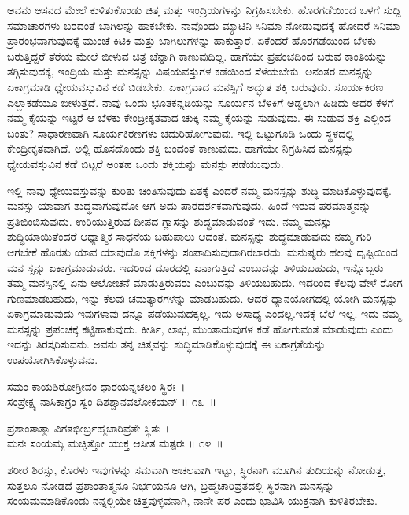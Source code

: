 ಅವನು ಆಸನದ ಮೇಲೆ ಕುಳಿತುಕೊಂಡು ಚಿತ್ತ ಮತ್ತು ಇಂದ್ರಿಯಗಳನ್ನು ನಿಗ್ರಹಿಸಬೇಕು. ಹೊರಗಡೆಯಿಂದ ಒಳಗೆ ಸುದ್ದಿ ಸಮಾಚಾರಗಳು ಬರದಂತೆ ಬಾಗಿಲನ್ನು ಹಾಕಬೇಕು. ನಾವೊಂದು ಮ್ಯಾಟಿನಿ ಸಿನಿಮಾ ನೋಡುವುದಕ್ಕೆ ಹೋದರೆ ಸಿನಿಮಾ ಪ್ರಾರಂಭವಾಗುವುದಕ್ಕೆ ಮುಂಚೆ ಕಿಟಿಕಿ ಮತ್ತು ಬಾಗಿಲುಗಳನ್ನು ಹಾಕುತ್ತಾರೆ. ಏಕೆಂದರೆ ಹೊರಗಡೆಯಿಂದ ಬೆಳಕು ಬರುತ್ತಿದ್ದರೆ ತೆರೆಯ ಮೇಲೆ ಬೀಳುವ ಚಿತ್ರ ಚೆನ್ನಾಗಿ ಕಾಣುವುದಿಲ್ಲ. ಹಾಗೆಯೇ ಪ್ರಪಂಚದಿಂದ ಬರುವ ಕಾಂತಿಯನ್ನು ತಗ್ಗಿಸುವುದಕ್ಕೆ, ಇಂದ್ರಿಯ ಮತ್ತು ಮನಸ್ಸನ್ನು ವಿಷಯವಸ್ತುಗಳ ಕಡೆಯಿಂದ ಸೆಳೆಯಬೇಕು. ಅನಂತರ ಮನಸ್ಸನ್ನು ಏಕಾಗ್ರಮಾಡಿ ಧ್ಯೇಯವಸ್ತುವಿನ ಕಡೆ ಬಿಡಬೇಕು. ಏಕಾಗ್ರವಾದ ಮನಸ್ಸಿಗೆ ಅದ್ಭುತ ಶಕ್ತಿ ಬರುವುದು. ಸೂರ್ಯಕಿರಣ ಎಲ್ಲಾಕಡೆಯೂ ಬೀಳುತ್ತದೆ. ನಾವು ಒಂದು ಭೂತಕನ್ನಡಿಯನ್ನು ಸೂರ್ಯನ ಬೆಳಕಿಗೆ ಅಡ್ಡಲಾಗಿ ಹಿಡಿದು ಅದರ ಕೆಳಗೆ ನಮ್ಮ ಕೈಯನ್ನು ಇಟ್ಟರೆ ಆ ಬೆಳಕು ಕೇಂದ್ರೀಕೃತವಾದ ಚುಕ್ಕಿ ನಮ್ಮ ಕೈಯನ್ನು ಸುಡುವುದು. ಈ ಸುಡುವ ಶಕ್ತಿ ಎಲ್ಲಿಂದ ಬಂತು? ಸಾಧಾರಣವಾಗಿ ಸೂರ್ಯಕಿರಣಗಳು ಚದುರಿಹೋಗುವುವು. ಇಲ್ಲಿ ಒಟ್ಟುಗೂಡಿ ಒಂದು ಸ್ಥಳದಲ್ಲಿ ಕೇಂದ್ರೀಕೃತವಾಗಿದೆ. ಅಲ್ಲಿ ಹೊಸದೊಂದು ಶಕ್ತಿ ಬಂದಂತೆ ಕಾಣುವುದು. ಹಾಗೆಯೇ ನಿಗ್ರಹಿಸಿದ ಮನಸ್ಸನ್ನು ಧ್ಯೇಯವಸ್ತುವಿನ ಕಡೆ ಬಿಟ್ಟರೆ ಅಂತಹ ಒಂದು ಶಕ್ತಿಯನ್ನು ಮನಸ್ಸು ಪಡೆಯುವುದು.

ಇಲ್ಲಿ ನಾವು ಧ್ಯೇಯವಸ್ತುವನ್ನು ಕುರಿತು ಚಿಂತಿಸುವುದು ಏತಕ್ಕೆ ಎಂದರೆ ನಮ್ಮ ಮನಸ್ಸನ್ನು ಶುದ್ಧಿ ಮಾಡಿಕೊಳ್ಳುವುದಕ್ಕೆ. ಮನಸ್ಸು ಯಾವಾಗ ಶುದ್ಧವಾಗುವುದೋ ಆಗ ಅದು ಪಾರದರ್ಶಕವಾಗುವುದು, ಹಿಂದೆ ಇರುವ ಪರಮಾತ್ಮನನ್ನು ಪ್ರತಿಬಿಂಬಿಸುವುದು. ಉರಿಯುತ್ತಿರುವ ದೀಪದ ಗ್ಲಾಸನ್ನು ಶುದ್ಧಮಾಡುವಂತೆ ಇದು. ನಮ್ಮ ಮನಸ್ಸು ಶುದ್ಧಿಯಾಯಿತೆಂದರೆ ಆಧ್ಯಾತ್ಮಿಕ ಸಾಧನೆಯ ಬಹುಪಾಲು ಆದಂತೆ. ಮನಸ್ಸನ್ನು ಶುದ್ಧಮಾಡುವುದು ನಮ್ಮ ಗುರಿ ಆಗಬೇಕೆ ಹೊರತು ಯಾವ ಯಾವುದೊ ಶಕ್ತಿಗಳನ್ನು ಸಂಪಾದಿಸುವುದಾಗಿರಬಾರದು. ಮನುಷ್ಯರು ಹಲವು ದೃಷ್ಟಿಯಿಂದ ಮನ ಸ್ಸನ್ನು ಏಕಾಗ್ರಮಾಡುವರು. ಇದರಿಂದ ದೂರದಲ್ಲಿ ಏನಾಗುತ್ತಿದೆ ಎಂಬುದನ್ನು ತಿಳಿಯಬಹುದು, ಇನ್ನೊಬ್ಬರು ತಮ್ಮ ಮನಸ್ಸಿನಲ್ಲಿ ಏನು ಆಲೋಚನೆ ಮಾಡುತ್ತಿರುವರು ಎಂಬುದನ್ನು ತಿಳಿಯಬಹುದು. ಇದರಿಂದ ಕೆಲವು ವೇಳೆ ರೋಗ ಗುಣಮಾಡಬಹುದು, ಇನ್ನು ಕೆಲವು ಚಮತ್ಕಾರಗಳನ್ನು ಮಾಡಬಹುದು. ಆದರೆ ಧ್ಯಾನಯೋಗದಲ್ಲಿ ಯೋಗಿ ಮನಸ್ಸನ್ನು ಏಕಾಗ್ರಮಾಡುವುದು ಇವುಗಳಾವು ದನ್ನೂ ಪಡೆಯುವುದಕ್ಕಲ್ಲ. ಇದು ಅಸಾಧ್ಯ ಎಂದಲ್ಲ.ಇದಕ್ಕೆ ಬೆಲೆ ಇಲ್ಲ. ಇದು ನಮ್ಮ ಮನಸ್ಸನ್ನು ಪ್ರಪಂಚಕ್ಕೆ ಕಟ್ಟಿಹಾಕುವುದು. ಕೀರ್ತಿ, ಲಾಭ, ಮುಂತಾದುವುಗಳ ಕಡೆ ಹೋಗುವಂತೆ ಮಾಡುವುದು ಎಂದು ಇದನ್ನು ತಿರಸ್ಕರಿಸುವನು. ಅವನು ತನ್ನ ಚಿತ್ತವನ್ನು ಶುದ್ಧಿಮಾಡಿಕೊಳ್ಳುವುದಕ್ಕೆ ಈ ಏಕಾಗ್ರತೆಯನ್ನು ಉಪಯೋಗಿಸಿಕೊಳ್ಳುವನು.

\begin{shloka}
ಸಮಂ ಕಾಯಶಿರೋಗ್ರೀವಂ ಧಾರಯನ್ನಚಲಂ ಸ್ಥಿರಃ~।\\ಸಂಪ್ರೇಕ್ಷ್ಯ ನಾಸಿಕಾಗ್ರಂ ಸ್ವಂ ದಿಶಶ್ಚಾನವಲೋಕಯನ್ \hfill॥ ೧೩~॥
\end{shloka}

\begin{shloka}
ಪ್ರಶಾಂತಾತ್ಮಾ ವಿಗತಭೀರ್ಬ್ರಹ್ಮಚಾರಿವ್ರತೇ ಸ್ಥಿತಃ~।\\ಮನಃ ಸಂಯಮ್ಯ ಮಚ್ಚಿತ್ತೋ ಯುಕ್ತ ಆಸೀತ ಮತ್ಪರಃ \hfill॥ ೧೪~॥
\end{shloka}

\begin{artha}
ಶರೀರ ಶಿರಸ್ಸು, ಕೊರಳು ಇವುಗಳನ್ನು ಸಮವಾಗಿ ಅಚಲವಾಗಿ ಇಟ್ಟು, ಸ್ಥಿರನಾಗಿ ಮೂಗಿನ ತುದಿಯನ್ನು ನೋಡುತ್ತ, ಸುತ್ತಲೂ ನೋಡದೆ ಪ್ರಶಾಂತಾತ್ಮನೂ ನಿರ್ಭಯನೂ ಆಗಿ, ಬ್ರಹ್ಮಚಾರಿವ್ರತದಲ್ಲಿ ಸ್ಥಿರನಾಗಿ ಮನಸ್ಸನ್ನು ಸಂಯಮಮಾಡಿಕೊಂಡು ನನ್ನಲ್ಲಿಯೇ ಚಿತ್ತವುಳ್ಳವನಾಗಿ, ನಾನೇ ಪರ ಎಂದು ಭಾವಿಸಿ ಯುಕ್ತನಾಗಿ ಕುಳಿತಿರಬೇಕು.
\end{artha}

